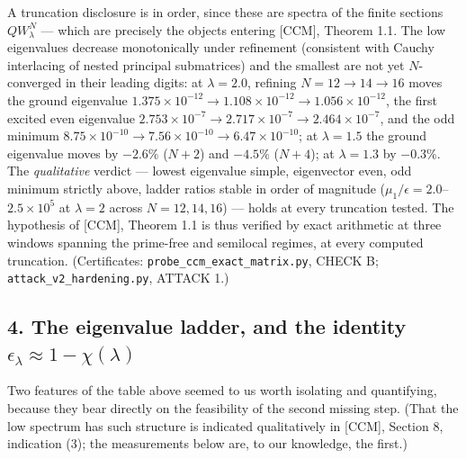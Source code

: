 \documentclass[
  letterpaper,
  11pt]{article}
\theoremstyle{plain}
\theoremstyle{definition}
\theoremstyle{remark}
\begin{document}
A truncation disclosure is in order, since these are spectra of the finite sections \(QW^N_\lambda\) --- which are precisely the objects entering {[}CCM{]}, Theorem 1.1. The low eigenvalues decrease monotonically under refinement (consistent with Cauchy interlacing of nested principal submatrices) and the smallest are not yet \(N\)-converged in their leading digits: at \(\lambda = 2.0\), refining \(N = 12 \to 14 \to 16\) moves the ground eigenvalue \(1.375\times10^{-12} \to 1.108\times10^{-12} \to 1.056\times10^{-12}\), the first excited even eigenvalue \(2.753\times10^{-7} \to 2.717\times10^{-7} \to 2.464\times10^{-7}\), and the odd minimum \(8.75\times10^{-10} \to 7.56\times10^{-10} \to 6.47\times10^{-10}\); at \(\lambda = 1.5\) the ground eigenvalue moves by \(-2.6\%\) (\(N{+}2\)) and \(-4.5\%\) (\(N{+}4\)); at \(\lambda = 1.3\) by \(-0.3\%\). The \emph{qualitative} verdict --- lowest eigenvalue simple, eigenvector even, odd minimum strictly above, ladder ratios stable in order of magnitude (\(\mu_1/\epsilon = 2.0\)--\(2.5\times10^5\) at \(\lambda = 2\) across \(N = 12,14,16\)) --- holds at every truncation tested. The hypothesis of {[}CCM{]}, Theorem 1.1 is thus verified by exact arithmetic at three windows spanning the prime-free and semilocal regimes, at every computed truncation. (Certificates: \texttt{probe\_ccm\_exact\_matrix.py}, CHECK B; \texttt{attack\_v2\_hardening.py}, ATTACK 1.)

\subsection{\texorpdfstring{4. The eigenvalue ladder, and the identity \(\epsilon_\lambda \approx 1 - \chi(\lambda)\)}{4. The eigenvalue ladder, and the identity \textbackslash epsilon\_\textbackslash lambda \textbackslash approx 1 - \textbackslash chi(\textbackslash lambda)}}\label{the-eigenvalue-ladder-and-the-identity-epsilon_lambda-approx-1---chilambda}

Two features of the table above seemed to us worth isolating and quantifying, because they bear directly on the feasibility of the second missing step. (That the low spectrum has such structure is indicated qualitatively in {[}CCM{]}, Section 8, indication (3); the measurements below are, to our knowledge, the first.)
\end{document}
